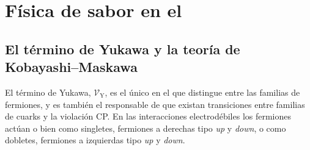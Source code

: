 \color{norm}




\section{Física de sabor en el \stdmod} %

\subsection{El término de Yukawa y la teoría de Kobayashi--Maskawa} %

El término de Yukawa, $\mathcal{V}_{\text{Y}}$, es el único en el \stdmod que distingue entre las familias de fermiones, y es también el responsable de que existan transiciones entre familias de cuarks y la violación CP.
En las interacciones electrodébiles los fermiones actúan o bien como singletes, fermiones a derechas tipo \emph{up} y \emph{down}, o como dobletes, fermiones a izquierdas tipo \emph{up} y \emph{down}.

